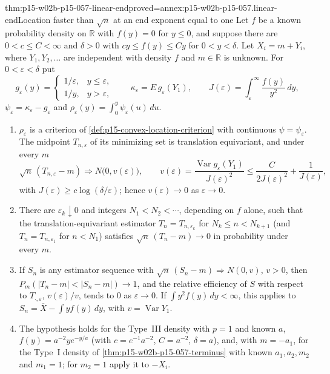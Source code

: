 \begin{hbtheorem}{thm:p15-w02b-p15-057-linear-end}{proved=annex:p15-w02b-p15-057.linear-end}{Location faster than \(\sqrt n\) at an end exponent equal to one}
Let \(f\) be a known probability density on \(\mathbb R\) with \(f(y)=0\)
for \(y\leq0\), and suppose there are \(0<c\leq C<\infty\) and
\(\delta>0\) with \(cy\leq f(y)\leq Cy\) for \(0<y<\delta\). Let
\(X_i=m+Y_i\), where \(Y_1,Y_2,\ldots\) are independent with density
\(f\) and \(m\in\mathbb R\) is unknown. For \(0<\varepsilon<\delta\) put
\[
 g_\varepsilon(y)=\begin{cases}1/\varepsilon,&y\leq\varepsilon,\\
 1/y,&y>\varepsilon,\end{cases}\qquad
 \kappa_\varepsilon=E\,g_\varepsilon(Y_1),\qquad
 J(\varepsilon)=\int_\varepsilon^\infty\frac{f(y)}{y^2}\,dy,
\]
\(\psi_\varepsilon=\kappa_\varepsilon-g_\varepsilon\) and
\(\rho_\varepsilon(y)=\int_0^y\psi_\varepsilon(u)\,du\).
\begin{enumerate}
\item \(\rho_\varepsilon\) is a criterion of
 \cref{def:p15-convex-location-criterion} with continuous
 \(\psi=\psi_\varepsilon\). The midpoint \(T_{n,\varepsilon}\) of its
 minimizing set is translation equivariant, and under every \(m\)
 \[
  \sqrt n\,(T_{n,\varepsilon}-m)\Rightarrow N\bigl(0,v(\varepsilon)\bigr),
  \qquad
  v(\varepsilon)=\frac{\operatorname{Var}g_\varepsilon(Y_1)}{J(\varepsilon)^2}
  \leq\frac{C}{2J(\varepsilon)^2}+\frac1{J(\varepsilon)},
 \]
 with \(J(\varepsilon)\geq c\log(\delta/\varepsilon)\); hence
 \(v(\varepsilon)\to0\) as \(\varepsilon\to0\).
\item There are \(\varepsilon_k\downarrow0\) and integers
 \(N_1<N_2<\cdots\), depending on \(f\) alone, such that the
 translation-equivariant estimator \(T_n=T_{n,\varepsilon_k}\) for
 \(N_k\leq n<N_{k+1}\) (and \(T_n=T_{n,\varepsilon_1}\) for \(n<N_1\))
 satisfies \(\sqrt n\,(T_n-m)\to0\) in probability under every \(m\).
\item If \(S_n\) is any estimator sequence with
 \(\sqrt n\,(S_n-m)\Rightarrow N(0,v)\), \(v>0\), then
 \(P_m(|T_n-m|<|S_n-m|)\to1\), and the relative efficiency of \(S\) with
 respect to \(T_{\cdot,\varepsilon}\), \(v(\varepsilon)/v\), tends to
 \(0\) as \(\varepsilon\to0\). If \(\int y^2f(y)\,dy<\infty\), this applies
 to \(S_n=\overline X-\int yf(y)\,dy\), with \(v=\operatorname{Var}Y_1\).
\item The hypothesis holds for the Type~III density with \(p=1\) and known
 \(a\), \(f(y)=a^{-2}ye^{-y/a}\) (with \(c=e^{-1}a^{-2}\), \(C=a^{-2}\),
 \(\delta=a\)), and, with \(m=-a_1\), for the Type~I density of
 \cref{thm:p15-w02b-p15-057-terminus} with known \(a_1,a_2,m_2\) and
 \(m_1=1\); for \(m_2=1\) apply it to \(-X_i\).
\end{enumerate}
\end{hbtheorem}

